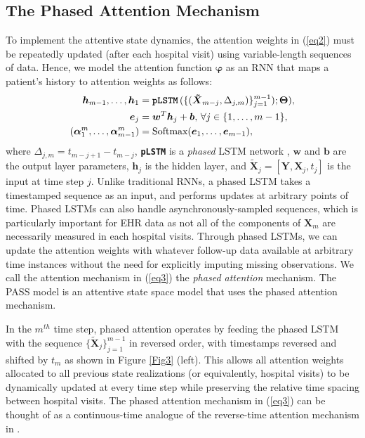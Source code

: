 \documentclass[twoside,11pt]{article}
\begin{document}
\subsection{The Phased Attention Mechanism}
\label{Sec33}
To implement the attentive state dynamics, the attention weights in (\ref{eq2}) must be repeatedly updated (after each hospital visit) using variable-length sequences of data. Hence, we model the attention function \mbox{\footnotesize $\boldsymbol{\varphi}$} as an RNN that maps a patient's history to attention weights as follows:   
\begin{align}
\boldsymbol{h}_{m-1},.\,.\,.\,,\boldsymbol{h}_{1} &= \mbox{\textbf{\texttt{pLSTM}}}\,(\{(\boldsymbol{\tilde{X}}_{m-j},\Delta_{j,m})\}_{j=1}^{m-1}) ; \boldsymbol{\Theta}), \nonumber \\
\boldsymbol{e}_{j} &=\boldsymbol{w}^{T}\boldsymbol{h}_{j} + \boldsymbol{b},\, \forall j \in \{1,.\,.\,.\,,m-1\}, \nonumber \\
(\boldsymbol{\alpha}^m_1,.\,.\,.\,,\boldsymbol{\alpha}^m_{m-1}) &= \mbox{Softmax}(\boldsymbol{e}_{1},.\,.\,.\,,\boldsymbol{e}_{m-1}),
\label{eq3}
\end{align} 
where \mbox{\footnotesize $\Delta_{j,m} = t_{m-j+1}-t_{m-j}$}, \textbf{\texttt{pLSTM}} is a {\it phased} LSTM network \cite{neil2016phased}, \mbox{\footnotesize $\boldsymbol{w}$} and \mbox{\footnotesize $\boldsymbol{b}$} are the output layer parameters, \mbox{\footnotesize $\boldsymbol{h}_j$} is the hidden layer, and \mbox{\footnotesize $\boldsymbol{\tilde{X}}_{j} = [\boldsymbol{Y},\boldsymbol{X}_{j},t_j]$} is the input at time step \mbox{\footnotesize $j$}. Unlike traditional RNNs, a phased LSTM takes a timestamped sequence as an input, and performs updates at arbitrary points of time. Phased LSTMs can also handle asynchronously-sampled sequences, which is particularly important for EHR data as not all of the components of \mbox{\footnotesize $\boldsymbol{X}_m$} are necessarily measured in each hospital visits. Through phased LSTMs, we can update the attention weights with whatever follow-up data available at arbitrary time instances without the need for explicitly imputing missing observations. We call the attention mechanism in (\ref{eq3}) the {\it phased attention} mechanism. The PASS model is an attentive state space model that uses the phased attention mechanism. 

In the \mbox{\footnotesize $m^{th}$} time step, phased attention operates by feeding the phased LSTM with the sequence \mbox{\footnotesize $\{\boldsymbol{\tilde{X}}_{j}\}_{j=1}^{m-1}$} in reversed order, with timestamps reversed and shifted by \mbox{\footnotesize $t_m$} as shown in Figure \ref{Fig3} (left). This allows all attention weights allocated to all previous state realizations (or equivalently, hospital visits) to be dynamically updated at every time step while preserving the relative time spacing between hospital visits. The phased attention mechanism in (\ref{eq3}) can be thought of as a continuous-time analogue of the reverse-time attention mechanism in \cite{choi2016retain}. 
\end{document}

